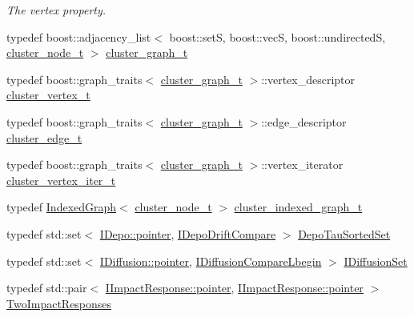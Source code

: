 \begin{DoxyCompactItemize}
\begin{DoxyCompactList}\small\item\em The vertex property. \end{DoxyCompactList}\item 
typedef boost\+::adjacency\+\_\+list$<$ boost\+::setS, boost\+::vecS, boost\+::undirectedS, \hyperlink{struct_wire_cell_1_1cluster__node__t}{cluster\+\_\+node\+\_\+t} $>$ \hyperlink{namespace_wire_cell_a6a9ecba14dfba50cdb081820a8bcacbe}{cluster\+\_\+graph\+\_\+t}
\item 
typedef boost\+::graph\+\_\+traits$<$ \hyperlink{namespace_wire_cell_a6a9ecba14dfba50cdb081820a8bcacbe}{cluster\+\_\+graph\+\_\+t} $>$\+::vertex\+\_\+descriptor \hyperlink{namespace_wire_cell_a13568b475bcf41285e67c5d0420bd1c0}{cluster\+\_\+vertex\+\_\+t}
\item 
typedef boost\+::graph\+\_\+traits$<$ \hyperlink{namespace_wire_cell_a6a9ecba14dfba50cdb081820a8bcacbe}{cluster\+\_\+graph\+\_\+t} $>$\+::edge\+\_\+descriptor \hyperlink{namespace_wire_cell_ad8467b97f80d30874cc5356432daf6f2}{cluster\+\_\+edge\+\_\+t}
\item 
typedef boost\+::graph\+\_\+traits$<$ \hyperlink{namespace_wire_cell_a6a9ecba14dfba50cdb081820a8bcacbe}{cluster\+\_\+graph\+\_\+t} $>$\+::vertex\+\_\+iterator \hyperlink{namespace_wire_cell_a11c4792993ad2c34d5d4bd1ddf2f1e8a}{cluster\+\_\+vertex\+\_\+iter\+\_\+t}
\item 
typedef \hyperlink{class_wire_cell_1_1_indexed_graph}{Indexed\+Graph}$<$ \hyperlink{struct_wire_cell_1_1cluster__node__t}{cluster\+\_\+node\+\_\+t} $>$ \hyperlink{namespace_wire_cell_a81d03e7272d04b607afc90bd3f7a9499}{cluster\+\_\+indexed\+\_\+graph\+\_\+t}
\item 
typedef std\+::set$<$ \hyperlink{class_wire_cell_1_1_i_data_aff870b3ae8333cf9265941eef62498bc}{I\+Depo\+::pointer}, \hyperlink{struct_wire_cell_1_1_i_depo_drift_compare}{I\+Depo\+Drift\+Compare} $>$ \hyperlink{namespace_wire_cell_ac01bef08345e4a479b147822eef2a405}{Depo\+Tau\+Sorted\+Set}
\item 
typedef std\+::set$<$ \hyperlink{class_wire_cell_1_1_i_data_aff870b3ae8333cf9265941eef62498bc}{I\+Diffusion\+::pointer}, \hyperlink{struct_wire_cell_1_1_i_diffusion_compare_lbegin}{I\+Diffusion\+Compare\+Lbegin} $>$ \hyperlink{namespace_wire_cell_ae8daa36d6182a834671ea359601da4a9}{I\+Diffusion\+Set}
\item 
typedef std\+::pair$<$ \hyperlink{class_wire_cell_1_1_interface_a09c548fb8266cfa39afb2e74a4615c37}{I\+Impact\+Response\+::pointer}, \hyperlink{class_wire_cell_1_1_interface_a09c548fb8266cfa39afb2e74a4615c37}{I\+Impact\+Response\+::pointer} $>$ \hyperlink{namespace_wire_cell_ae163f7e69ff1625cf269418b35194d37}{Two\+Impact\+Responses}

\end{DoxyCompactItemize}
